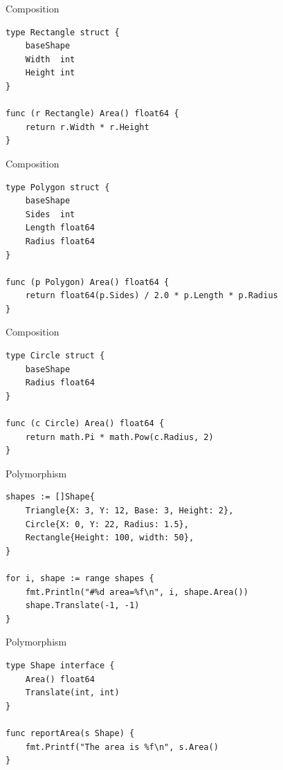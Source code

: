 \documentclass[pdf]{beamer}
\begin{document}
\begin{frame}[fragile]{Composition}
\begin{lstlisting}
type Rectangle struct {
    baseShape
    Width  int
    Height int
}

func (r Rectangle) Area() float64 {
    return r.Width * r.Height
}
\end{lstlisting}
\end{frame}

\begin{frame}[fragile]{Composition}
\begin{lstlisting}
type Polygon struct {
    baseShape
    Sides  int
    Length float64
    Radius float64
}

func (p Polygon) Area() float64 {
    return float64(p.Sides) / 2.0 * p.Length * p.Radius
}
\end{lstlisting}
\end{frame}

\begin{frame}[fragile]{Composition}
\begin{lstlisting}
type Circle struct {
    baseShape
    Radius float64
}

func (c Circle) Area() float64 {
    return math.Pi * math.Pow(c.Radius, 2)
}
\end{lstlisting}
\end{frame}

\begin{frame}[fragile]{Polymorphism}
\begin{lstlisting}
shapes := []Shape{
    Triangle{X: 3, Y: 12, Base: 3, Height: 2},
    Circle{X: 0, Y: 22, Radius: 1.5},
    Rectangle{Height: 100, width: 50},
}

for i, shape := range shapes {
    fmt.Println("#%d area=%f\n", i, shape.Area())
    shape.Translate(-1, -1)
}
\end{lstlisting}
\end{frame}

\begin{frame}[fragile]{Polymorphism}
\begin{lstlisting}
type Shape interface {
    Area() float64
    Translate(int, int)
}

func reportArea(s Shape) {
    fmt.Printf("The area is %f\n", s.Area()
}
\end{lstlisting}
\end{frame}
\end{document}
